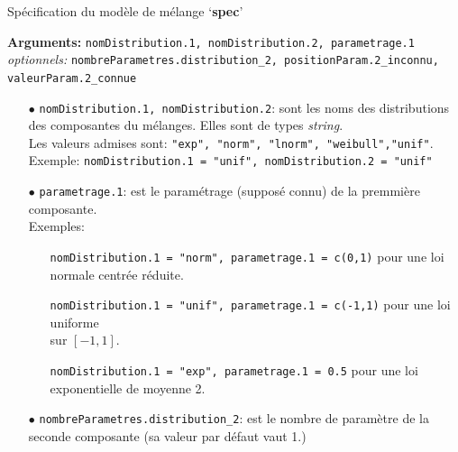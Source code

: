 \documentclass{article}
\newenvironment{fonction}[1][htb]
  {\renewcommand{\algorithmcfname}{Fonction}%
   \begin{algorithm}[#1]%
  }{\end{algorithm}}
\begin{document}
    \begin{fonction}[h!]
        \caption{Spécification du modèle de mélange \textrm{`\textbf{spec}'} }
             \textbf{Arguments:} \texttt{nomDistribution.1, nomDistribution.2, parametrage.1} \\
             \textit{optionnels:} \texttt{nombreParametres.distribution\_2, positionParam.2\_inconnu, \hspace*{1.55cm} valeurParam.2\_connue}
             \begin{itemize}
                 \item[$\bullet$] \texttt{nomDistribution.1, nomDistribution.2}: sont les noms des distributions des composantes du mélanges.
                 Elles sont de types \textit{string}. \\ Les valeurs admises sont: \texttt{"exp", "norm", "lnorm", "weibull","unif"}. \\
                 \vspace*{0.2cm}
                 Exemple: \texttt{nomDistribution.1 = "unif", nomDistribution.2 = "unif"} \\
                 \vspace*{0.2cm}
                 \item[$\bullet$] \texttt{parametrage.1}: est le paramétrage (supposé connu) de la premmière composante. \\
                 \vspace*{0.2cm}
                 Exemples:\begin{itemize}
                     \item[] \texttt{nomDistribution.1 = "norm", parametrage.1 = c(0,1)} pour une loi normale centrée réduite.
                     \item[] \texttt{nomDistribution.1 = "unif", parametrage.1 = c(-1,1)} pour une loi uniforme \\ sur $[-1,1]$. 
                     \item[] \texttt{nomDistribution.1 = "exp", parametrage.1 = 0.5} pour une loi exponentielle de moyenne 2.
                         \end{itemize}
                 \vspace*{0.2cm}
                 \item[$\bullet$] \texttt{nombreParametres.distribution\_2}: est le nombre de paramètre de la seconde composante (sa valeur par défaut vaut 1.) \\

\end{itemize}
\end{fonction}
\end{document}
